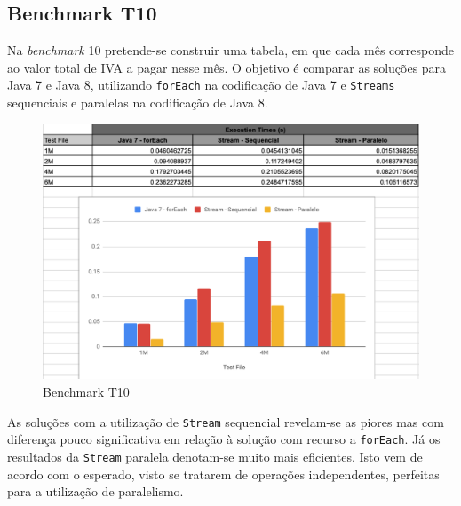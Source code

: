 \documentclass{article}
\begin{document}
\subsection{Benchmark T10}
Na \textit{benchmark} 10 pretende-se construir uma tabela, em que cada mês corresponde ao valor total de IVA a pagar nesse mês. O objetivo é comparar as soluções para Java 7 e Java 8, utilizando \texttt{forEach} na codificação de Java 7 e \texttt{Streams} sequenciais e paralelas na codificação de Java 8.
\begin{figure}[H]
    \centering
    \includegraphics[width=15cm]{Pictures/T10.png}
    \caption{Benchmark T10}
\end{figure}

As soluções com a utilização de \texttt{Stream} sequencial revelam-se as piores mas com diferença pouco significativa em relação à solução com recurso a \texttt{forEach}. Já os resultados da \texttt{Stream} paralela denotam-se muito mais eficientes. Isto vem de acordo com o esperado, visto se tratarem de operações independentes, perfeitas para a utilização de paralelismo.
\newpage
\end{document}
